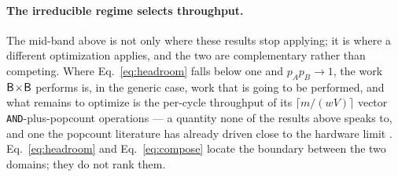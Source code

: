 \paragraph*{The irreducible regime selects throughput.}
The mid-band above is not only where these results stop applying; it is where a different optimization
applies, and the two are complementary rather than competing. Where Eq.~\eqref{eq:headroom} falls below
one and $p_Ap_B\to1$, the work $\textsf{B}\!\times\!\textsf{B}$ performs is, in the generic case, work that is going to
be performed, and what remains to optimize is the per-cycle throughput of its $\lceil m/(wV)\rceil$
vector \texttt{AND}-plus-popcount operations --- a quantity none of the results above speaks to, and one
the popcount literature has already driven close to the hardware limit \cite{mula2018popcount}.
Eq.~\eqref{eq:headroom} and Eq.~\eqref{eq:compose} locate the boundary between the two domains; they do
not rank them.
